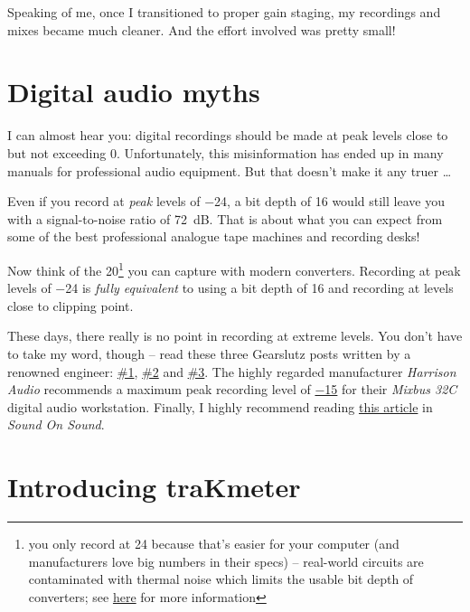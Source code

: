 Speaking of me, once I transitioned to proper gain staging, my
recordings and mixes became much cleaner.  And the effort involved was
pretty small!

\section{Digital audio myths}
\label{sec:digital_audio_myths}

I can almost hear you: digital recordings should be made at peak
levels close to but not exceeding \SI{0}{\dBFS}.  Unfortunately, this
misinformation has ended up in many manuals for professional audio
equipment.  But that doesn't make it any truer \dots

Even if you record at \emph{peak} levels of \SI{-24}{\dBFS}, a bit
depth of \SI{16}{\bits} would still leave you with a signal-to-noise
ratio of \SI{72}{\dB}.  That is about what you can expect from some of
the best professional analogue tape machines and recording desks!

Now think of the \SI{20}{\bits}\footnote{you only record at
  \SI{24}{\bits} because that's easier for your computer (and
  manufacturers love big numbers in their specs) -- real-world
  circuits are contaminated with thermal noise which limits the usable
  bit depth of converters; see
  \href{http://www.sengpielaudio.com/calculator-noise.htm}{here} for
  more information} you can capture with modern converters.  Recording
at peak levels of \SI{-24}{\dBFS} is \emph{fully equivalent} to using
a bit depth of \SI{16}{\bits} and recording at levels close to
clipping point.

These days, there really is no point in recording at extreme levels.
You don't have to take my word, though -- read these three Gearslutz
posts written by a renowned engineer:
\href{https://www.gearslutz.com/board/showpost.php?p=10739624&postcount=9}{\#1},
\href{https://www.gearslutz.com/board/showpost.php?p=5063154&postcount=219}{\#2}
and
\href{https://www.gearslutz.com/board/showpost.php?p=9909382&postcount=96}{\#3}.
The highly regarded manufacturer \emph{Harrison Audio} recommends a
maximum peak recording level of
\href{http://www.harrisonconsoles.com/mixbus/mixbus32c-6-live-manual/1/en/topic/gain-staging}{\SI{-15}{\dBFS}}
for their \emph{Mixbus 32C} digital audio workstation.  Finally, I
highly recommend reading
\href{https://www.soundonsound.com/techniques/gain-staging-your-daw-software}{this
  article} in \emph{Sound On Sound}.

\section{Introducing traKmeter}
\label{sec:introducing_trakmeter}

